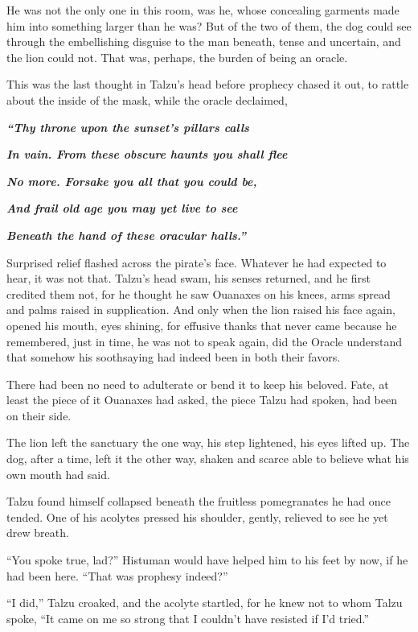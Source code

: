 He was not the only one in this room, was he, whose concealing garments made him into something larger than he was? But of the two of them, the dog could see through the embellishing disguise to the man beneath, tense and uncertain, and the lion could not. That was, perhaps, the burden of being an oracle.

This was the last thought in Talzu's head before prophecy chased it out, to rattle about the inside of the mask, while the oracle declaimed,

\emph{\textbf{``Thy throne upon the sunset's pillars calls}}

\emph{\textbf{In vain. From these obscure haunts you shall flee}}

\emph{\textbf{No more. Forsake you all that you could be,}}

\emph{\textbf{And frail old age you may yet live to see}}

\emph{\textbf{Beneath the hand of these oracular halls.''}}

Surprised relief flashed across the pirate's face. Whatever he had expected to hear, it was not that. Talzu's head swam, his senses returned, and he first credited them not, for he thought he saw Ouanaxes on his knees, arms spread and palms raised in supplication. And only when the lion raised his face again, opened his mouth, eyes shining, for effusive thanks that never came because he remembered, just in time, he was not to speak again, did the Oracle understand that somehow his soothsaying had indeed been in both their favors.

There had been no need to adulterate or bend it to keep his beloved. Fate, at least the piece of it Ouanaxes had asked, the piece Talzu had spoken, had been on their side.

The lion left the sanctuary the one way, his step lightened, his eyes lifted up. The dog, after a time, left it the other way, shaken and scarce able to believe what his own mouth had said.

Talzu found himself collapsed beneath the fruitless pomegranates he had once tended. One of his acolytes pressed his shoulder, gently, relieved to see he yet drew breath.

``You spoke true, lad?'' Histuman would have helped him to his feet by now, if he had been here. ``That was prophesy indeed?''

``I did,'' Talzu croaked, and the acolyte startled, for he knew not to whom Talzu spoke, ``It came on me so strong that I couldn't have resisted if I'd tried.''

